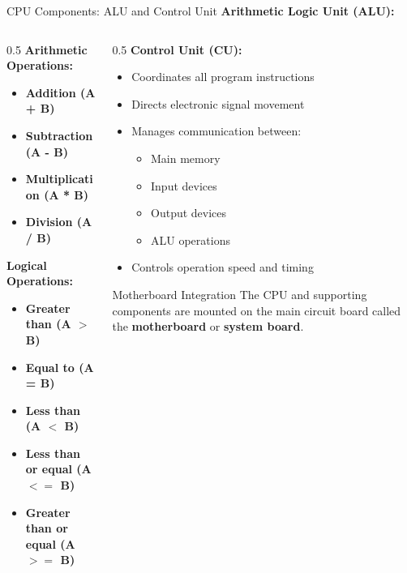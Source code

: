 \documentclass[aspectratio=169]{beamer}
\begin{document}
\begin{frame}{CPU Components: ALU and Control Unit}
    \textbf{Arithmetic Logic Unit (ALU):}
    
    \begin{columns}
        \begin{column}{0.5\textwidth}
            \textbf{Arithmetic Operations:}
            \begin{itemize}
                \item \textbf{Addition (A + B)}
                \item \textbf{Subtraction (A - B)}
                \item \textbf{Multiplication (A * B)}
                \item \textbf{Division (A / B)}
            \end{itemize}
            
            \textbf{Logical Operations:}
            \begin{itemize}
                \item \textbf{Greater than (A $>$ B)}
                \item \textbf{Equal to (A = B)}
                \item \textbf{Less than (A $<$ B)}
                \item \textbf{Less than or equal (A $<=$ B)}
                \item \textbf{Greater than or equal (A $>=$ B)}
            \end{itemize}
        \end{column}
        \begin{column}{0.5\textwidth}
            \textbf{Control Unit (CU):}
            \begin{itemize}
                \item Coordinates all program instructions
                \item Directs electronic signal movement
                \item Manages communication between:
                \begin{itemize}
                    \item Main memory
                    \item Input devices
                    \item Output devices
                    \item ALU operations
                \end{itemize}
                \item Controls operation speed and timing
            \end{itemize}
             \begin{block}{Motherboard Integration}
        The CPU and supporting components are mounted on the main circuit board called the \textbf{motherboard} or \textbf{system board}.
    \end{block}
        \end{column}
    \end{columns}
    
   
\end{frame}
\end{document}

